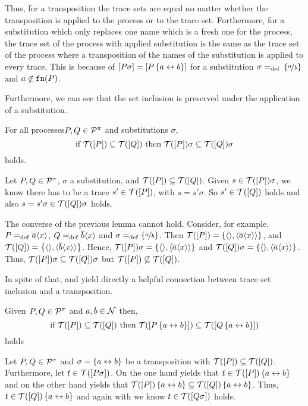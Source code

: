 Thus, for a transposition the trace sets are equal no matter whether the transposition is applied to the process or to the trace set. Furthermore, for a substitution which only replaces one name which is a fresh one for the process, the trace set of the process with applied substitution is the same as the trace set of the process where a transposition of the names of the substitution is applied to every trace. This is because of $\left[P\sigma\right]=\left[P\left\{a\leftrightarrow{}b\right\}\right]$ for a substitution $\sigma=_{\mathrm{def}}{}\left\{\nicefrac{a}{b}\right\}$ and $a\not\in\mathtt{fn}(P)$.

Furthermore, we can see that the set inclusion is preserved under the application of a substitution.

\begin{lemma}
\label{lem_subst_trace_inclusion}
For all processes\newline{}$P,Q\in\mathcal P^{\pi}$ and substitutions $\sigma$,
\[\text{if }\traces[P]\subseteq\traces[Q] \text{ then } \traces[P]\sigma\subseteq\traces[Q]\sigma\]
holds.
\end{lemma}
\begin{prf}
Let $P,Q\in\mathcal P^{\pi}$, $\sigma$ a substitution, and $\traces[P]\subseteq\traces[Q]$. Given $s\in\traces[P]\sigma$, we know there has to be a trace $s'\in\traces[P]$, with $s=s'\sigma$. So $s'\in\traces[Q]$ holds and also $s=s'\sigma\in\traces[Q]\sigma$ holds.
\end{prf}

The converse of the previous lemma cannot hold. Consider, for example, $P=_{\mathrm{def}}{}\overline{a}\langle x\rangle$, $Q=_{\mathrm{def}}{}\overline{b}\langle x\rangle$ and $\sigma=_{\mathrm{def}}\left\{\nicefrac{a}{b}\right\}$. Then $\traces[P]=\set{\eseq,\seq{\outa{a}{x}}}$, and $\traces[Q]=\set{\eseq,\seq{\outa{b}{x}}}$. Hence, $\traces[P]\sigma=\set{\eseq,\seq{\outa{a}{x}}}$ and $\traces[Q]\sigma=\set{\eseq,\seq{\outa{a}{x}}}$. Thus, $\traces[P]\sigma\subseteq\traces[Q]\sigma$ but $\traces[P]\not\subseteq{}\traces[Q]$.

In spite of that,  and  yield directly a helpful connection between trace set inclusion and a transposition.

\begin{cor}
\label{cor_subst_trace_inclusion}
Given $P,Q\in\mathcal P^{\pi}$ and $a,b\in\mathcal N$ then,
\[\text{if }\traces[P]\subseteq\traces[Q] \text{ then } \traces[P\transp{a}{b}]\subseteq\traces[Q\transp{a}{b}]\]
holds
\end{cor}
\begin{prf}
Let $P,Q\in\mathcal P^{\pi}$ and $\sigma=\left\{a\leftrightarrow{}b\right\}$ be a transposition with $\traces[P]\subseteq\traces[Q]$. Furthermore, let $t\in\traces[P\sigma]$. On the one hand  yields that $t\in\traces[P]\transp{a}{b}$ and on the other hand  yields that $\traces[P]\transp{a}{b}\subseteq\traces[Q]\transp{a}{b}$. Thus, $t\in\traces[Q]\transp{a}{b}$ and again with  we know $t\in\traces[Q\sigma]$ holds.
\end{prf}

